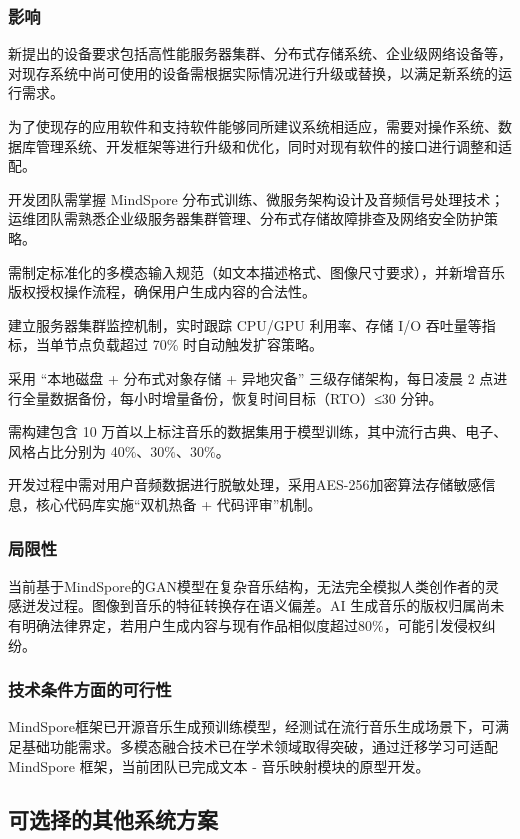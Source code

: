 \documentclass{base}
\numberwithin{figure}{section} %
\begin{document}
\subsubsection{影响}

新提出的设备要求包括高性能服务器集群、分布式存储系统、企业级网络设备等，对现存系统中尚可使用的设备需根据实际情况进行升级或替换，以满足新系统的运行需求。

为了使现存的应用软件和支持软件能够同所建议系统相适应，需要对操作系统、数据库管理系统、开发框架等进行升级和优化，同时对现有软件的接口进行调整和适配。

开发团队需掌握 MindSpore 分布式训练、微服务架构设计及音频信号处理技术；运维团队需熟悉企业级服务器集群管理、分布式存储故障排查及网络安全防护策略。

需制定标准化的多模态输入规范（如文本描述格式、图像尺寸要求），并新增音乐版权授权操作流程，确保用户生成内容的合法性。

建立服务器集群监控机制，实时跟踪 CPU/GPU 利用率、存储 I/O 吞吐量等指标，当单节点负载超过 70\% 时自动触发扩容策略。  

采用 “本地磁盘 + 分布式对象存储 + 异地灾备” 三级存储架构，每日凌晨 2 点进行全量数据备份，每小时增量备份，恢复时间目标（RTO）≤30 分钟。

需构建包含 10 万首以上标注音乐的数据集用于模型训练，其中流行古典、电子、风格占比分别为 40\%、30\%、30\%。

开发过程中需对用户音频数据进行脱敏处理，采用AES-256加密算法存储敏感信息，核心代码库实施“双机热备 + 代码评审”机制。

\subsubsection{局限性}

当前基于MindSpore的GAN模型在复杂音乐结构，无法完全模拟人类创作者的灵感迸发过程。图像到音乐的特征转换存在语义偏差。AI 生成音乐的版权归属尚未有明确法律界定，若用户生成内容与现有作品相似度超过80\%，可能引发侵权纠纷。

\subsubsection{技术条件方面的可行性}

MindSpore框架已开源音乐生成预训练模型，经测试在流行音乐生成场景下，可满足基础功能需求。多模态融合技术已在学术领域取得突破，通过迁移学习可适配 MindSpore 框架，当前团队已完成文本 - 音乐映射模块的原型开发。

\subsection{可选择的其他系统方案}
\end{document}
